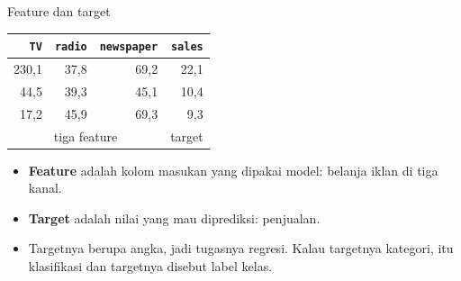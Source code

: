 \documentclass[aspectratio=169,t]{beamer}
\begin{document}
\begin{frame}{Feature dan target}
  \vspace{0.2em}
  \begin{center}
  {\small\renewcommand{\arraystretch}{1.25}
  \begin{tabular}{rrr|r}
    \toprule
    \rowcolor{nvcard}\color{nvgreen}\texttt{TV} & \color{nvgreen}\texttt{radio} &
    \color{nvgreen}\texttt{newspaper} & \color{nvorange}\texttt{sales} \\
    \midrule
    230,1 & 37,8 & 69,2 & 22,1 \\
    \rowcolor{nvcard!60!nvbg} 44,5 & 39,3 & 45,1 & 10,4 \\
    17,2 & 45,9 & 69,3 & 9,3 \\
    \bottomrule
    \multicolumn{3}{c}{\color{nvgreen}\small tiga feature} &
    \multicolumn{1}{c}{\color{nvorange}\small target} \\
  \end{tabular}}
  \end{center}
  \vspace{0.3em}
  \begin{itemize}\setlength\itemsep{0.35em}
    \item \textbf{Feature} adalah kolom masukan yang dipakai model: belanja iklan di tiga kanal.
    \item \textbf{Target} adalah nilai yang mau diprediksi: penjualan.
    \item Targetnya berupa angka, jadi tugasnya regresi. Kalau targetnya kategori, itu
          klasifikasi dan targetnya disebut label kelas.
  \end{itemize}
\end{frame}
\end{document}

